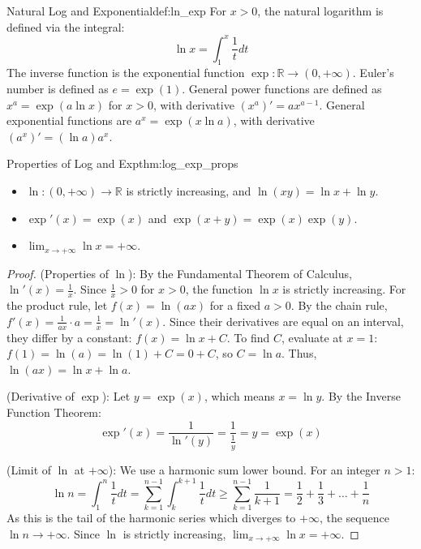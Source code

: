\documentclass[11pt, a4paper]{article}
\begin{document}
\begin{definition}{Natural Log and Exponential}{def:ln_exp}
For $x > 0$, the natural logarithm is defined via the integral:
$$ \ln x = \int_1^x \frac{1}{t} dt $$
The inverse function is the exponential function $\exp: \mathbb{R} \to (0, +\infty)$. Euler's number is defined as $e = \exp(1)$.
General power functions are defined as $x^a = \exp(a \ln x)$ for $x > 0$, with derivative $(x^a)' = a x^{a-1}$.
General exponential functions are $a^x = \exp(x \ln a)$, with derivative $(a^x)' = (\ln a) a^x$.
\end{definition}

\begin{theorem}{Properties of Log and Exp}{thm:log_exp_props}
\begin{itemize}
    \item $\ln: (0, +\infty) \to \mathbb{R}$ is strictly increasing, and $\ln(xy) = \ln x + \ln y$.
    \item $\exp'(x) = \exp(x)$ and $\exp(x+y) = \exp(x)\exp(y)$.
    \item $\lim_{x \to +\infty} \ln x = +\infty$.
\end{itemize}
\end{theorem}
\begin{proof}
(Properties of $\ln$): By the Fundamental Theorem of Calculus, $\ln'(x) = \frac{1}{x}$. Since $\frac{1}{x} > 0$ for $x > 0$, the function $\ln x$ is strictly increasing.
For the product rule, let $f(x) = \ln(ax)$ for a fixed $a > 0$. By the chain rule, $f'(x) = \frac{1}{ax} \cdot a = \frac{1}{x} = \ln'(x)$.
Since their derivatives are equal on an interval, they differ by a constant: $f(x) = \ln x + C$. 
To find $C$, evaluate at $x = 1$: $f(1) = \ln(a) = \ln(1) + C = 0 + C$, so $C = \ln a$.
Thus, $\ln(ax) = \ln x + \ln a$.

(Derivative of $\exp$): Let $y = \exp(x)$, which means $x = \ln y$. By the Inverse Function Theorem:
$$ \exp'(x) = \frac{1}{\ln'(y)} = \frac{1}{\frac{1}{y}} = y = \exp(x) $$

(Limit of $\ln$ at $+\infty$): We use a harmonic sum lower bound. For an integer $n > 1$:
$$ \ln n = \int_1^n \frac{1}{t} dt = \sum_{k=1}^{n-1} \int_k^{k+1} \frac{1}{t} dt \ge \sum_{k=1}^{n-1} \frac{1}{k+1} = \frac{1}{2} + \frac{1}{3} + \dots + \frac{1}{n} $$
As this is the tail of the harmonic series which diverges to $+\infty$, the sequence $\ln n \to +\infty$. Since $\ln$ is strictly increasing, $\lim_{x \to +\infty} \ln x = +\infty$.
\end{proof}
\end{document}
